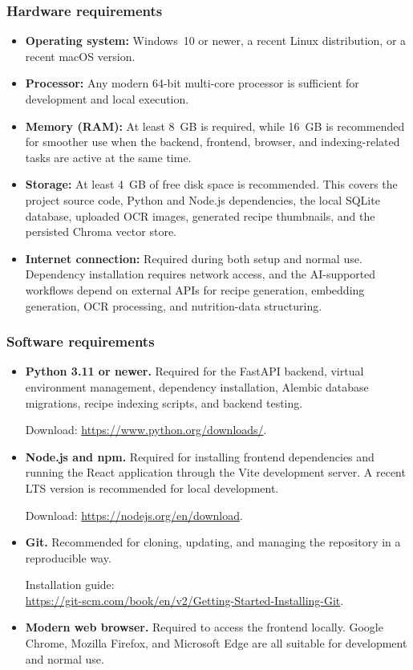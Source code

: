 \subsubsection{Hardware requirements}

\begin{itemize}
	\item \textbf{Operating system:} Windows~10 or newer, a recent Linux
	distribution, or a recent macOS version.
	\item \textbf{Processor:} Any modern 64-bit multi-core processor is
	sufficient for development and local execution.
	\item \textbf{Memory (RAM):} At least 8~GB is required, while 16~GB is
	recommended for smoother use when the backend, frontend, browser,
	and indexing-related tasks are active at the same time.
	\item \textbf{Storage:} At least 4~GB of free disk space is
	recommended. This covers the project source code, Python and Node.js
	dependencies, the local SQLite database, uploaded OCR images,
	generated recipe thumbnails, and the persisted Chroma vector store.
	\item \textbf{Internet connection:} Required during both setup and
	normal use. Dependency installation requires network access, and the
	AI-supported workflows depend on external APIs for recipe generation,
	embedding generation, OCR processing, and nutrition-data
	structuring.
\end{itemize}

\subsubsection{Software requirements}

\begin{itemize}
	\item \textbf{Python 3.11 or newer.} Required for the FastAPI backend,
	virtual environment management, dependency installation, Alembic
	database migrations, recipe indexing scripts, and backend testing.

	Download: \url{https://www.python.org/downloads/}.
	\item \textbf{Node.js and npm.} Required for installing frontend
	dependencies and running the React application through the Vite
	development server. A recent LTS version is recommended for local
	development.

	Download: \url{https://nodejs.org/en/download}.
	\item \textbf{Git.} Recommended for cloning, updating, and managing
	the repository in a reproducible way.

	Installation guide:\\
	\url{https://git-scm.com/book/en/v2/Getting-Started-Installing-Git}.
	\item \textbf{Modern web browser.} Required to access the frontend
	locally. Google Chrome, Mozilla Firefox, and Microsoft Edge are all
	suitable for development and normal use.
\end{itemize}

